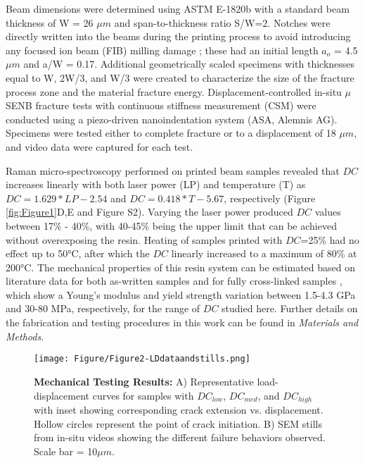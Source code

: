 \documentclass[11pt]{article}
\providecommand{\um}[0]{$\mu m$}
\providecommand{\uSENB}[0]{$\mu$SENB}
\providecommand{\DC}[0]{$DC$}
\providecommand{\DClow}[0]{$DC_{low}$}
\providecommand{\DCmed}[0]{$DC_{med}$}
\providecommand{\DChi}[0]{$DC_{high}$}
\begin{document}
        Beam dimensions were determined using ASTM E-1820b \cite{ASTM-E1820} with a standard beam thickness of W = 26 \um{} and span-to-thickness ratio S/W=2.
        Notches were directly written into the beams during the printing process to avoid introducing any focused ion beam (FIB) milling damage \cite{ast2019review}; these had an initial length $a_{o}$ = 4.5 \um{} and a/W = 0.17.
        Additional geometrically scaled specimens with thicknesses equal to W, 2W/3, and W/3 were created to characterize the size of the fracture process zone and the material fracture energy.
        Displacement-controlled in-situ \uSENB{} fracture tests with continuous stiffness measurement (CSM) were conducted using a piezo-driven nanoindentation system (ASA, Alemnis AG).
        Specimens were tested either to complete fracture or to a displacement of 18 \um{}, and video data were captured for each test.

        Raman micro-spectroscopy performed on printed beam samples revealed that \DC{} increases linearly with both laser power (LP) and temperature (T) as $DC = 1.629*LP-2.54$ and $DC = 0.418*T-5.67$, respectively (Figure \ref{fig:Figure1}D,E and Figure S2).
        Varying the laser power produced \DC{} values between 17\% - 40\%, with 40-45\% being the upper limit that can be achieved without overexposing the resin.
        Heating of samples printed with \DC{}=25\% had no effect up to 50°C, after which the \DC{} linearly increased to a maximum of 80\% at 200°C.
        The mechanical properties of this resin system can be estimated based on literature data for both as-written samples \cite{bauer2019programmable} and for fully cross-linked samples \cite{bauer2020thermal}, which show a Young's modulus and yield strength variation between 1.5-4.3 GPa and 30-80 MPa, respectively, for the range of \DC{} studied here.
        Further details on the fabrication and testing procedures in this work can be found in \textit{Materials and Methods}.

        \begin{figure*}[ht!]
                \texttt{[image: Figure/Figure2-LDdataandstills.png]} 
                \caption{\textbf{Mechanical Testing Results:}  
                A) Representative load-displacement curves for samples with \DClow{}, \DCmed{}, and \DChi{} with inset showing corresponding crack extension vs. displacement.
                Hollow circles represent the point of crack initiation. 
                B) SEM stills from in-situ videos showing the different failure behaviors observed. Scale bar = 10\um{}.}
                \label{fig:Figure2} 
        \end{figure*}
\end{document}

